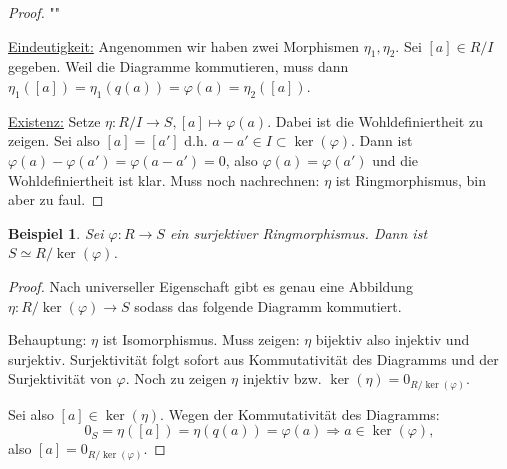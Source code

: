\documentclass[a4paper,12pt,numbers=noenddot,parskip=full]{scrartcl}
\newcommand{\heading}{\underline}
\theoremstyle{dotless}
\newtheorem{example}[theorem]{Beispiel}
\theoremstyle{remark}
\begin{document}
	\begin{proof}""
		
		\heading{Eindeutigkeit:} Angenommen wir haben zwei Morphismen $\eta_1, \eta_2$. Sei $[a] \in R/I$ gegeben. Weil die Diagramme kommutieren, muss dann $\eta_1([a]) = \eta_1(q(a)) = \varphi(a) = \eta_2([a])$.
		
		\heading{Existenz:} Setze $\eta: R/I \to S, [a] \mapsto \varphi(a)$. Dabei ist die Wohldefiniertheit zu zeigen. Sei also $[a] = [a']$ d.h. $a - a' \in I \subset \ker(\varphi)$. Dann ist $\varphi(a) - \varphi(a') = \varphi(a - a') = 0$, also $\varphi(a) = \varphi(a')$ und die Wohldefiniertheit ist klar. Muss noch nachrechnen: $\eta$ ist Ringmorphismus, bin aber zu faul.
	\end{proof}

	\begin{example}
		Sei $\varphi: R \to S$ ein surjektiver Ringmorphismus. Dann ist $S \simeq R/\ker(\varphi)$.
	\end{example}

	\begin{proof}
		Nach universeller Eigenschaft gibt es genau eine Abbildung $\eta: R/\ker(\varphi) \to S$ sodass das folgende Diagramm kommutiert.
		
		\begin{center}
		\end{center}
		
		Behauptung: $\eta$ ist Isomorphismus. Muss zeigen: $\eta$ bijektiv also injektiv und surjektiv. Surjektivität folgt sofort aus Kommutativität des Diagramms und der Surjektivität von $\varphi$. Noch zu zeigen $\eta$ injektiv bzw. $\ker(\eta) = 0_{R/\ker(\varphi)}$.
		
		Sei also $[a] \in \ker(\eta)$. Wegen der Kommutativität des Diagramms:
		\begin{equation*}
			0_S = \eta([a]) = \eta(q(a)) = \varphi(a) \Rightarrow a \in \ker(\varphi),
		\end{equation*}
		also $[a] = 0_{R/\ker(\varphi)}$.
	\end{proof}
\end{document}
